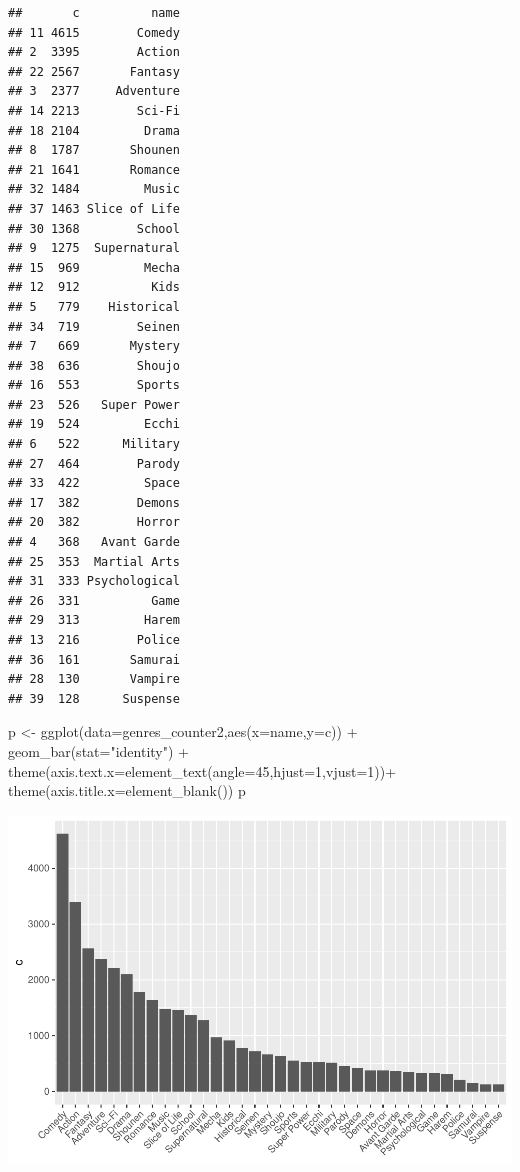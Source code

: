 \documentclass[
]{article}
\newenvironment{Shaded}{\begin{snugshade}}{\end{snugshade}}
\newcommand{\AttributeTok}[1]{\textcolor[rgb]{0.77,0.63,0.00}{#1}}
\newcommand{\DecValTok}[1]{\textcolor[rgb]{0.00,0.00,0.81}{#1}}
\newcommand{\FunctionTok}[1]{\textcolor[rgb]{0.00,0.00,0.00}{#1}}
\newcommand{\NormalTok}[1]{#1}
\newcommand{\OtherTok}[1]{\textcolor[rgb]{0.56,0.35,0.01}{#1}}
\newcommand{\SpecialCharTok}[1]{\textcolor[rgb]{0.00,0.00,0.00}{#1}}
\newcommand{\StringTok}[1]{\textcolor[rgb]{0.31,0.60,0.02}{#1}}
\begin{document}
\begin{verbatim}
##       c          name
## 11 4615        Comedy
## 2  3395        Action
## 22 2567       Fantasy
## 3  2377     Adventure
## 14 2213        Sci-Fi
## 18 2104         Drama
## 8  1787       Shounen
## 21 1641       Romance
## 32 1484         Music
## 37 1463 Slice of Life
## 30 1368        School
## 9  1275  Supernatural
## 15  969         Mecha
## 12  912          Kids
## 5   779    Historical
## 34  719        Seinen
## 7   669       Mystery
## 38  636        Shoujo
## 16  553        Sports
## 23  526   Super Power
## 19  524         Ecchi
## 6   522      Military
## 27  464        Parody
## 33  422         Space
## 17  382        Demons
## 20  382        Horror
## 4   368   Avant Garde
## 25  353  Martial Arts
## 31  333 Psychological
## 26  331          Game
## 29  313         Harem
## 13  216        Police
## 36  161       Samurai
## 28  130       Vampire
## 39  128      Suspense
\end{verbatim}

\begin{Shaded}
\begin{Highlighting}[]
\NormalTok{p }\OtherTok{\textless{}{-}} \FunctionTok{ggplot}\NormalTok{(}\AttributeTok{data=}\NormalTok{genres\_counter2,}\FunctionTok{aes}\NormalTok{(}\AttributeTok{x=}\NormalTok{name,}\AttributeTok{y=}\NormalTok{c)) }\SpecialCharTok{+}
  \FunctionTok{geom\_bar}\NormalTok{(}\AttributeTok{stat=}\StringTok{"identity"}\NormalTok{) }\SpecialCharTok{+}
  \FunctionTok{theme}\NormalTok{(}\AttributeTok{axis.text.x=}\FunctionTok{element\_text}\NormalTok{(}\AttributeTok{angle=}\DecValTok{45}\NormalTok{,}\AttributeTok{hjust=}\DecValTok{1}\NormalTok{,}\AttributeTok{vjust=}\DecValTok{1}\NormalTok{))}\SpecialCharTok{+}
  \FunctionTok{theme}\NormalTok{(}\AttributeTok{axis.title.x=}\FunctionTok{element\_blank}\NormalTok{())}
\NormalTok{p}
\end{Highlighting}
\end{Shaded}

\includegraphics{R_analysis_files/figure-latex/unnamed-chunk-5-1.pdf}
\end{document}
